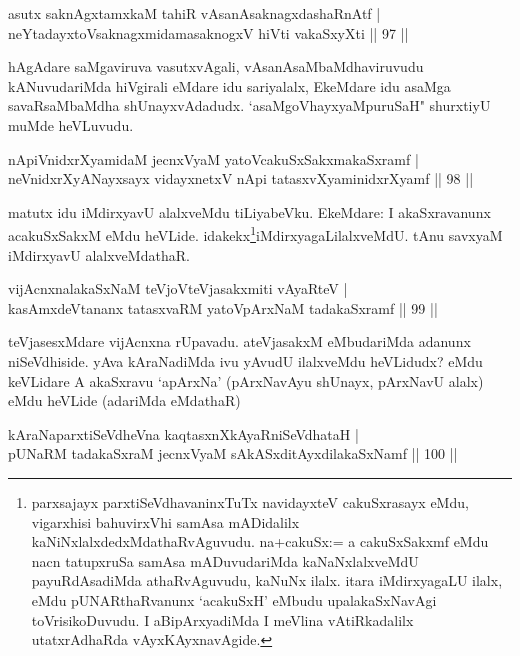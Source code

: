 \begin{shl}
asutx saknAgxtamxkaM tahiR vAsanAsaknagxdashaRnAtf |\\
neYtadayxtoV\s saknagxmidamasaknogxV hiVti vakaSxyXti \hfill || 97 ||
\end{shl}

\begin{artha}
hAgAdare saMgaviruva vasutxvAgali, vAsanAsaMbaMdhaviruvudu kANuvudariMda hiVgirali eMdare idu sariyalalx, EkeMdare idu asaMga savaRsaMbaMdha shUnayxvAdadudx. `asaMgoVhayxyaMpuruSaH" shurxtiyU muMde heVLuvudu.
\end{artha}

\begin{shl}
nApiVnidxrXyamidaM jecnxVyaM yatoV\s cakuSxSakxmakaSxramf |\\
neVnidxrXyANayxsayx vidayxnetxV nApi tatasxvXyaminidxrXyamf \hfill || 98 ||
\end{shl}

\begin{artha}
matutx idu iMdirxyavU alalxveMdu tiLiyabeVku. EkeMdare: I akaSxravanunx acakuSxSakxM eMdu heVLide. idakekx\footnote{parxsajayx parxtiSeVdhavaninxTuTx navidayxteV cakuSxrasayx eMdu, vigarxhisi bahuvirxVhi samAsa mADidalilx kaNiNxlalxdedxMdathaRvAguvudu. na+cakuSx:= a cakuSxSakxmf eMdu nacn tatupxruSa samAsa mADuvudariMda kaNaNxlalxveMdU payuRdAsadiMda athaRvAguvudu, kaNuNx ilalx. itara iMdirxyagaLU ilalx, eMdu pUNARthaRvanunx `acakuSxH' eMbudu upalakaSxNavAgi toVrisikoDuvudu. I aBipArxyadiMda I meVlina vAtiRkadalilx utatxrAdhaRda vAyxKAyxnavAgide.}iMdirxyagaLilalxveMdU. tAnu savxyaM iMdirxyavU alalxveMdathaR.
\end{artha}

\begin{shl}
vijAcnxnalakaSxNaM teVjoV\s teVjasakxmiti vAyaRteV |\\
kasAmxdeVtananx tatasxvaRM yatoV\s pArxNaM tadakaSxramf \hfill || 99 ||
\end{shl}

\begin{artha}%
teVjasesxMdare vijAcnxna rUpavadu. ateVjasakxM eMbudariMda adanunx niSeVdhiside. yAva kAraNadiMda ivu yAvudU ilalxveMdu heVLidudx? eMdu keVLidare A akaSxravu `apArxNa' (pArxNavAyu shUnayx, pArxNavU alalx) eMdu heVLide (adariMda eMdathaR)
\end{artha}


\begin{shl}
kAraNaparxtiSeVdheVna kaqtasxnXkAyaRniSeVdhataH |\\
pUNaRM tadakaSxraM jecnxVyaM sAkASxditAyxdilakaSxNamf \hfill || 100 ||
\end{shl}

